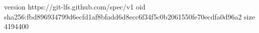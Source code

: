 version https://git-lfs.github.com/spec/v1
oid sha256:fbd896934799d6ecfd1af8bfadd6d8ecc6f34f5c0b2061550fe70ecdfa0d96a2
size 4194400
